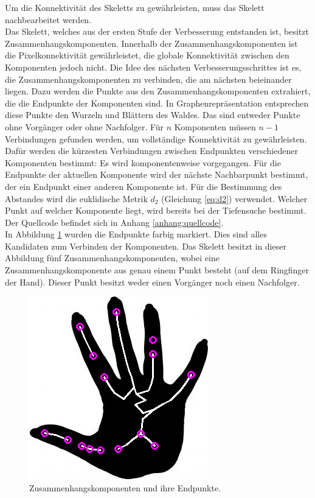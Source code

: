 Um die Konnektivität des Skeletts zu gewährleisten, muss das Skelett nachbearbeitet werden. \\
Das Skelett, welches aus der ersten Stufe der Verbesserung entstanden ist, besitzt Zusammenhangskomponenten. Innerhalb der Zusammenhangskomponenten ist die Pixelkonnektivität gewährleistet, die globale Konnektivität zwischen den Komponenten jedoch nicht. Die Idee des
nächsten Verbesserungsschrittes ist es, die Zusammenhangskomponenten
zu verbinden, die am nächsten beieinander liegen. Dazu werden
die Punkte aus den Zusammenhangskomponenten extrahiert, die die Endpunkte der Komponenten sind. In Graphenrepräsentation entsprechen diese Punkte den Wurzeln und Blättern des Waldes. Das sind
entweder Punkte ohne Vorgänger oder ohne Nachfolger. Für $n$ Komponenten müssen $n-1$ Verbindungen gefunden werden, um vollständige Konnektivität zu gewährleisten. Dafür werden die kürzesten Verbindungen zwischen Endpunkten verschiedener Komponenten bestimmt:
Es wird komponentenweise vorgegangen.
Für die Endpunkte der aktuellen Komponente wird der nächste Nachbarpunkt bestimmt, der ein Endpunkt einer anderen Komponente ist. Für die Bestimmung des Abstandes wird die euklidische Metrik $d_2$ (Gleichung \ref{eq:d2}) verwendet. Welcher Punkt auf welcher Komponente liegt, wird bereits bei der Tiefensuche bestimmt. Der Quellcode befindet sich in Anhang \ref{anhang:quellcode}. \\
In Abbildung \ref{fig:offeneenden} wurden die Endpunkte farbig markiert. Dies sind
alles Kandidaten zum Verbinden der Komponenten. Das Skelett besitzt in dieser Abbildung fünf Zusammenhangskomponenten,
wobei eine Zusammenhangskomponente aus genau einem Punkt besteht
(auf dem Ringfinger der Hand). Dieser Punkt besitzt weder einen Vorgänger noch einen Nachfolger.
\begin{figure}[ht]
\centering
\includegraphics[width=0.4\linewidth]{./fig/offeneEnden.png}
\caption{Zusammenhangskomponenten und ihre Endpunkte.}
\label{fig:offeneenden}
\end{figure}
